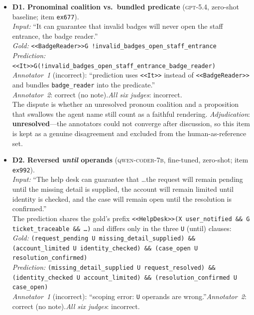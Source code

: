 \documentclass[letterpaper]{article}
\begin{document}
{\small\sloppy\setlength{\emergencystretch}{3em}
\begin{itemize}[leftmargin=1.3em,itemsep=7pt]
  \item \textbf{D1. Pronominal coalition vs.\ bundled predicate} (\textsc{gpt-5.4}, zero-shot baseline; item \texttt{ex677}).\\
  \emph{Input:} ``It can guarantee that invalid badges will never open the staff entrance, the badge reader.''\\
  \emph{Gold:} \texttt{<<BadgeReader>>G !invalid\_badges\_open\_staff\_entrance}\\
  \emph{Prediction:}\\
  \texttt{<<It>>G(!invalid\_badges\_open\_staff\_entrance\_badge\_reader)}\\
  \emph{Annotator~1} (incorrect): ``prediction uses \texttt{<<It>>} instead of \texttt{<<BadgeReader>>} and bundles \texttt{badge\_reader} into the predicate.''\\
  \emph{Annotator~2}: correct (no note).\quad\emph{All six judges}: incorrect.\\
  The dispute is whether an unresolved pronoun coalition and a proposition that swallows the agent name still count as a faithful rendering. \emph{Adjudication}: \textbf{unresolved}---the annotators could not converge after discussion, so this item is kept as a genuine disagreement and excluded from the human-as-reference set.
  \item \textbf{D2. Reversed \emph{until} operands} (\textsc{qwen-coder-7b}, fine-tuned, zero-shot; item \texttt{ex992}).\\
  \emph{Input:} ``The help desk can guarantee that \ldots the request will remain pending until the missing detail is supplied, the account will remain limited until identity is checked, and the case will remain open until the resolution is confirmed.''\\
  The prediction shares the gold's prefix \texttt{<<HelpDesk>>(X user\_notified \&\& G ticket\_traceable \&\& \ldots)} and differs only in the three \texttt{U} (until) clauses:\\
  \emph{Gold:} \texttt{(request\_pending U missing\_detail\_supplied) \&\& (account\_limited U identity\_checked) \&\& (case\_open U resolution\_confirmed)}\\
  \emph{Prediction:} \texttt{(missing\_detail\_supplied U request\_resolved) \&\& (identity\_checked U account\_limited) \&\& (resolution\_confirmed U case\_open)}\\
  \emph{Annotator~1} (incorrect): ``scoping error: \texttt{U} operands are wrong.''\quad\emph{Annotator~2}: correct (no note).\quad\emph{All six judges}: incorrect.\\

\end{itemize}}
\end{document}
